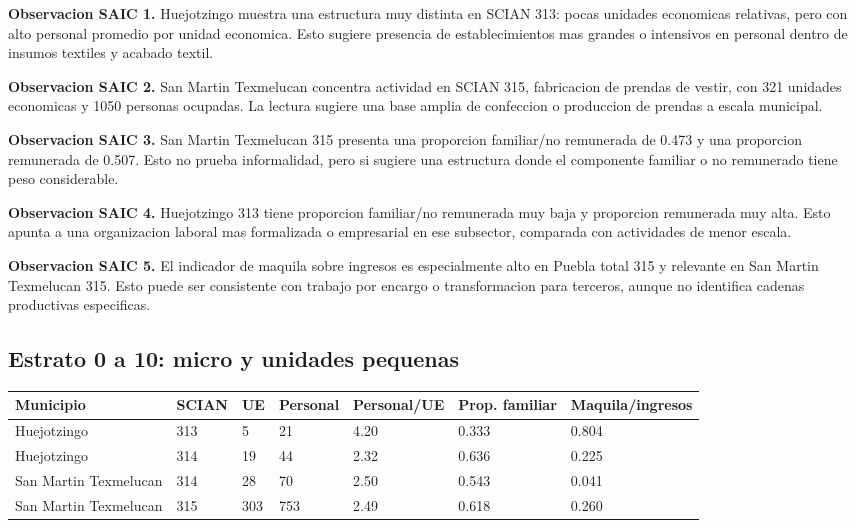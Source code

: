 \documentclass[11pt,letterpaper]{article}
\begin{document}
\textbf{Observacion SAIC 1.} Huejotzingo muestra una estructura muy distinta en SCIAN 313: pocas unidades economicas relativas, pero con alto personal promedio por unidad economica. Esto sugiere presencia de establecimientos mas grandes o intensivos en personal dentro de insumos textiles y acabado textil.

\textbf{Observacion SAIC 2.} San Martin Texmelucan concentra actividad en SCIAN 315, fabricacion de prendas de vestir, con 321 unidades economicas y 1050 personas ocupadas. La lectura sugiere una base amplia de confeccion o produccion de prendas a escala municipal.

\textbf{Observacion SAIC 3.} San Martin Texmelucan 315 presenta una proporcion familiar/no remunerada de 0.473 y una proporcion remunerada de 0.507. Esto no prueba informalidad, pero si sugiere una estructura donde el componente familiar o no remunerado tiene peso considerable.

\textbf{Observacion SAIC 4.} Huejotzingo 313 tiene proporcion familiar/no remunerada muy baja y proporcion remunerada muy alta. Esto apunta a una organizacion laboral mas formalizada o empresarial en ese subsector, comparada con actividades de menor escala.

\textbf{Observacion SAIC 5.} El indicador de maquila sobre ingresos es especialmente alto en Puebla total 315 y relevante en San Martin Texmelucan 315. Esto puede ser consistente con trabajo por encargo o transformacion para terceros, aunque no identifica cadenas productivas especificas.

\subsection{Estrato 0 a 10: micro y unidades pequenas}

\begin{longtable}{p{3.3cm}p{1.7cm}p{1.5cm}p{1.7cm}p{2.1cm}p{2.2cm}p{2.2cm}}
\toprule
Municipio & SCIAN & UE & Personal & Personal/UE & Prop. familiar & Maquila/ingresos \\
\midrule
Huejotzingo & 313 & 5 & 21 & 4.20 & 0.333 & 0.804 \\
Huejotzingo & 314 & 19 & 44 & 2.32 & 0.636 & 0.225 \\
San Martin Texmelucan & 314 & 28 & 70 & 2.50 & 0.543 & 0.041 \\
San Martin Texmelucan & 315 & 303 & 753 & 2.49 & 0.618 & 0.260 \\
\bottomrule
\end{longtable}
\end{document}
